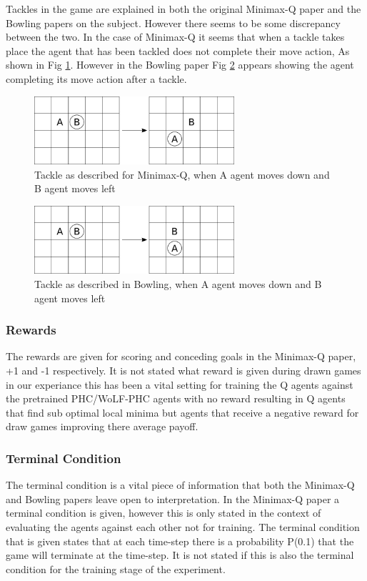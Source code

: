\documentclass{article}
\begin{document}
Tackles in the game are explained in both the original Minimax-Q paper and the Bowling papers on the subject. However there seems to be some discrepancy between the two. In the case of Minimax-Q it seems that when a tackle takes place the agent that has been tackled does not complete their move action, As shown in Fig \ref{fig:minimax-tackle}. However in the Bowling paper Fig \ref{fig:bowling-tackle} appears showing the agent completing its move action after a tackle. 

\begin{figure}
    \centering
    \includegraphics[width=20em]{./Figures/minimax-tackle.png}
    \caption{Tackle as described for Minimax-Q, when A agent moves down and B agent moves left}
    \label{fig:minimax-tackle}
\end{figure}

\begin{figure}
    \centering
    \includegraphics[width=20em]{./Figures/bowling-tackle.png}
    \caption{Tackle as described in Bowling, when A agent moves down and B agent moves left}
    \label{fig:bowling-tackle}
\end{figure}

\subsubsection*{Rewards}

The rewards are given for scoring and conceding goals in the Minimax-Q paper, +1 and -1 respectively. It is not stated what reward is given during drawn games in our experiance this has been a vital setting for training the Q agents against the pretrained PHC/WoLF-PHC agents with no reward resulting in Q agents that find sub optimal local minima but agents that receive a negative reward for draw games improving there average payoff.

\subsubsection*{Terminal Condition}
The terminal condition is a vital piece of information that both the Minimax-Q and Bowling papers leave open to interpretation. In the Minimax-Q paper a terminal condition is given, however this is only stated in the context of evaluating the agents against each other not for training. The terminal condition that is given states that at each time-step there is a probability P(0.1) that the game will terminate at the time-step. It is not stated if this is also the terminal condition for the training stage of the experiment.
\end{document}
